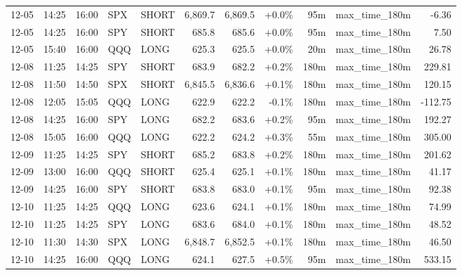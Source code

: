 \documentclass[11pt,a4paper,twoside]{article}
\begin{document}
\begin{center}
\begin{longtable}{>{\color{txtmain}}l l l l l r r r r >{\color{txtmain}}l r}
12-05 & 14:25 & 16:00 & SPX & SHORT & 6,869.7 & 6,869.5 & \textcolor{wingreen}{+0.0\%} & 95m & max\_time\_180m & \textcolor{lossred}{-6.36} \\
12-05 & 14:25 & 16:00 & SPY & SHORT & 685.8 & 685.6 & \textcolor{wingreen}{+0.0\%} & 95m & max\_time\_180m & \textcolor{wingreen}{7.50} \\
12-05 & 15:40 & 16:00 & QQQ & LONG & 625.3 & 625.5 & \textcolor{wingreen}{+0.0\%} & 20m & max\_time\_180m & \textcolor{wingreen}{26.78} \\
12-08 & 11:25 & 14:25 & SPY & SHORT & 683.9 & 682.2 & \textcolor{wingreen}{+0.2\%} & 180m & max\_time\_180m & \textcolor{wingreen}{229.81} \\
12-08 & 11:50 & 14:50 & SPX & SHORT & 6,845.5 & 6,836.6 & \textcolor{wingreen}{+0.1\%} & 180m & max\_time\_180m & \textcolor{wingreen}{120.15} \\
12-08 & 12:05 & 15:05 & QQQ & LONG & 622.9 & 622.2 & \textcolor{lossred}{-0.1\%} & 180m & max\_time\_180m & \textcolor{lossred}{-112.75} \\
12-08 & 14:25 & 16:00 & SPY & LONG & 682.2 & 683.6 & \textcolor{wingreen}{+0.2\%} & 95m & max\_time\_180m & \textcolor{wingreen}{192.27} \\
12-08 & 15:05 & 16:00 & QQQ & LONG & 622.2 & 624.2 & \textcolor{wingreen}{+0.3\%} & 55m & max\_time\_180m & \textcolor{wingreen}{305.00} \\
12-09 & 11:25 & 14:25 & SPY & SHORT & 685.2 & 683.8 & \textcolor{wingreen}{+0.2\%} & 180m & max\_time\_180m & \textcolor{wingreen}{201.62} \\
12-09 & 13:00 & 16:00 & QQQ & SHORT & 625.4 & 625.1 & \textcolor{wingreen}{+0.1\%} & 180m & max\_time\_180m & \textcolor{wingreen}{41.17} \\
12-09 & 14:25 & 16:00 & SPY & SHORT & 683.8 & 683.0 & \textcolor{wingreen}{+0.1\%} & 95m & max\_time\_180m & \textcolor{wingreen}{92.38} \\
12-10 & 11:25 & 14:25 & QQQ & LONG & 623.6 & 624.1 & \textcolor{wingreen}{+0.1\%} & 180m & max\_time\_180m & \textcolor{wingreen}{74.99} \\
12-10 & 11:25 & 14:25 & SPY & LONG & 683.6 & 684.0 & \textcolor{wingreen}{+0.1\%} & 180m & max\_time\_180m & \textcolor{wingreen}{48.52} \\
12-10 & 11:30 & 14:30 & SPX & LONG & 6,848.7 & 6,852.5 & \textcolor{wingreen}{+0.1\%} & 180m & max\_time\_180m & \textcolor{wingreen}{46.50} \\
12-10 & 14:25 & 16:00 & QQQ & LONG & 624.1 & 627.5 & \textcolor{wingreen}{+0.5\%} & 95m & max\_time\_180m & \textcolor{wingreen}{533.15} \\

\end{longtable}
\end{center}
\end{document}
